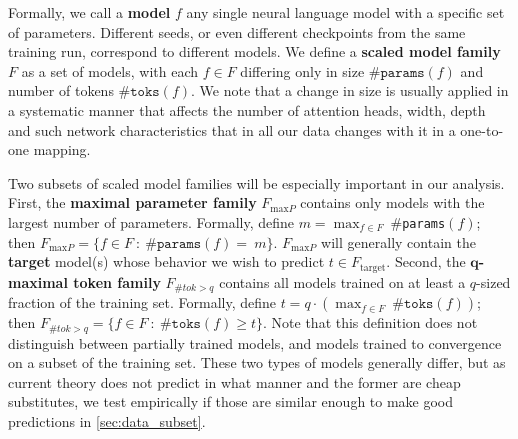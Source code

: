 \documentclass{article}
\theoremstyle{plain}
\theoremstyle{definition}
\theoremstyle{remark}
\newcommand{\mathmsize}{\#\texttt{params}}
\newcommand{\mathtokens}{\#\texttt{toks}}
\newcommand{\mathperf}{L}
\newcommand{\msize}{$\mathmsize{}$}
\DeclareMathOperator{\Send}{end}
\newcommand{\xmodel}{f}
\newcommand{\xfamily}{F}
\newcommand{\xtarget}{F_\mathrm{target}}
\newcommand{\maxtok}[1]{\xfamily_{\# tok>#1}}
\newcommand{\maxparam}{\xfamily_{\mathrm{max}P}}
\begin{document}
Formally, we call a \textbf{model} $\xmodel$ any single neural language model with a specific set of parameters. Different seeds, or even different checkpoints from the same training run, correspond to different models.
We define a \textbf{scaled model family} $\xfamily$ as a set of models, with each $\xmodel\in \xfamily$ differing only in size $\mathmsize{}(\xmodel)$
and number of tokens $\mathtokens{}(\xmodel)$. We note that a change in size is usually applied in a systematic manner that affects the number of attention heads, width, depth and such network characteristics that in all our data changes with it in a one-to-one mapping.

Two subsets of scaled model families will be especially important in our analysis. First, the \textbf{maximal parameter family} $\maxparam{}$ contains only models with the largest number of parameters. Formally,
define $m = \max_{\xmodel \in \xfamily} ~ \msize(\xmodel)$; then $\maxparam = \{\xmodel \in \xfamily ~:~ \mathmsize(\xmodel) =~ m \}$. $\maxparam$ will generally contain the \textbf{target} model(s) whose behavior we wish to predict $t\in \xtarget$.
Second, the \textbf{$\mathbf{q}$-maximal token family} $\maxtok{q}$ contains all models trained on at least a $q$-sized fraction of the training set. Formally, define $t = q \cdot (\max_{\xmodel \in \xfamily} ~ \mathtokens(\xmodel))$; then $\maxtok{q} = \{\xmodel \in \xfamily ~:~ \mathtokens(\xmodel) \geq t\}$. 
Note that this definition does not distinguish between partially trained models, and models trained to convergence on a subset of the training set.
These two types of models generally differ, but as current theory does not predict in what manner and the former are cheap substitutes, we test empirically if those are similar enough to make good predictions in \cref{sec:data_subset}.




\end{document}
